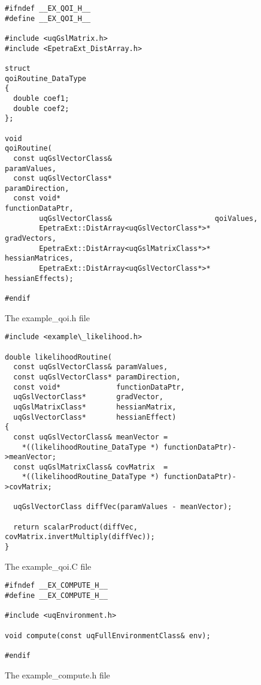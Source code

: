 \begin{figure}[h!]
\begin{center}
\begin{verbatim}
#ifndef __EX_QOI_H__
#define __EX_QOI_H__

#include <uqGslMatrix.h>
#include <EpetraExt_DistArray.h>

struct
qoiRoutine_DataType
{
  double coef1;
  double coef2;
};

void
qoiRoutine(
  const uqGslVectorClass&                        paramValues,
  const uqGslVectorClass*                        paramDirection,
  const void*                                    functionDataPtr,
        uqGslVectorClass&                        qoiValues,
        EpetraExt::DistArray<uqGslVectorClass*>* gradVectors,
        EpetraExt::DistArray<uqGslMatrixClass*>* hessianMatrices,
        EpetraExt::DistArray<uqGslVectorClass*>* hessianEffects);

#endif
\end{verbatim}
\end{center}
\caption{
The example\_qoi.h file
}
\label{fig-qoi-h}
\end{figure}

\begin{figure}[h!]
\begin{center}
\begin{verbatim}
#include <example\_likelihood.h>

double likelihoodRoutine(
  const uqGslVectorClass& paramValues,
  const uqGslVectorClass* paramDirection,
  const void*             functionDataPtr,
  uqGslVectorClass*       gradVector,
  uqGslMatrixClass*       hessianMatrix,
  uqGslVectorClass*       hessianEffect)
{
  const uqGslVectorClass& meanVector =
    *((likelihoodRoutine_DataType *) functionDataPtr)->meanVector;
  const uqGslMatrixClass& covMatrix  =
    *((likelihoodRoutine_DataType *) functionDataPtr)->covMatrix;

  uqGslVectorClass diffVec(paramValues - meanVector);

  return scalarProduct(diffVec, covMatrix.invertMultiply(diffVec));
}
\end{verbatim}
\end{center}
\caption{
The example\_qoi.C file
}
\label{fig-qoi-c}
\end{figure}

\begin{figure}[h!]
\begin{center}
\begin{verbatim}
#ifndef __EX_COMPUTE_H__
#define __EX_COMPUTE_H__

#include <uqEnvironment.h>

void compute(const uqFullEnvironmentClass& env);

#endif
\end{verbatim}
\end{center}
\caption{
The example\_compute.h file
}
\label{fig-compute-h}
\end{figure}

